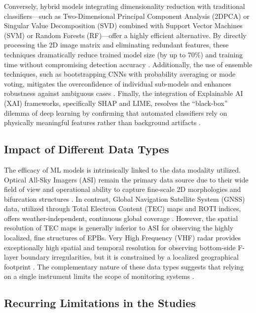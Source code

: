Conversely, hybrid models integrating dimensionality reduction with traditional classifiers---such as Two-Dimensional Principal Component Analysis (2DPCA) or Singular Value Decomposition (SVD) combined with Support Vector Machines (SVM) or Random Forests (RF)---offer a highly efficient alternative. By directly processing the 2D image matrix and eliminating redundant features, these techniques dramatically reduce trained model size (by up to 70\%) and training time without compromising detection accuracy \cite{yacoub2025automatic,thanakulketsarat2023classification,siddiqui2025enhanced}. Additionally, the use of ensemble techniques, such as bootstrapping CNNs with probability averaging or mode voting, mitigates the overconfidence of individual sub-models and enhances robustness against ambiguous cases \cite{okoh2025bootstrapping}. Finally, the integration of Explainable AI (XAI) frameworks, specifically SHAP and LIME, resolves the ``black-box'' dilemma of deep learning by confirming that automated classifiers rely on physically meaningful features rather than background artifacts \cite{siddiqui2025enhanced}.

\subsection{Impact of Different Data Types}\label{subsec:impact-of-different-data-types}

The efficacy of ML models is intrinsically linked to the data modality utilized. Optical All-Sky Imagers (ASI) remain the primary data source due to their wide field of view and operational ability to capture fine-scale 2D morphologies and bifurcation structures \cite{githio2024machine,zhong2025automatic}. In contrast, Global Navigation Satellite System (GNSS) data, utilized through Total Electron Content (TEC) maps and ROTI indices, offers weather-independent, continuous global coverage \cite{githio2024machine}. However, the spatial resolution of TEC maps is generally inferior to ASI for observing the highly localized, fine structures of EPBs. Very High Frequency (VHF) radar provides exceptionally high spatial and temporal resolution for observing bottom-side F-layer boundary irregularities, but it is constrained by a localized geographical footprint \cite{thanakulketsarat2023classification}. The complementary nature of these data types suggests that relying on a single instrument limits the scope of monitoring systems \cite{githio2024machine}.

\subsection{Recurring Limitations in the Studies}\label{subsec:recurring-limitations-in-the-studies}

